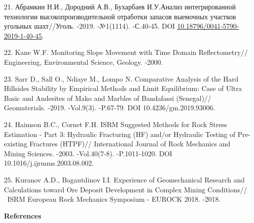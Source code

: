 \begin{refs}
21. Абрамкин Н.И., Дородний А.В., Бухарбаев И.У.Анализ интегрированной
технологии высокопроизводительной отработки запасов выемочных участков
угольных шахт//Уголь. -2019. -№1(1114). -С.40-45. DOI
\href{http://dx.doi.org/10.18796/0041-5790-2019-1-40-45}{10.18796/0041-5790-2019-1-40-45}.

22. Kane W.F. Monitoring Slope Movement with Time Domain Reflectometry//
Engineering, Environmental Science, Geology. -2000.

23. Sarr D., Sall O., Ndiaye M., Lompo N. Comparative Analysis of the
Hard Hillsides Stability by Empirical Methods and Limit Equilibrium:
Case of Ultra Basic and Andesites of Mako and Marbles of Bandafassi
(Senegal)// Geomaterials. -2019. -Vol.9(3). -P.67-79. DOI
10.4236/gm.2019.93006.

24. Haimson B.C., Cornet F.H. ISRM Suggested Methods for Rock Stress
Estimation - Part 3: Hydraulic Fracturing (HF) and/or Hydraulic Testing
of Pre-existing Fractures (HTPF)// International Journal of Rock
Mechanics and Mining Sciences. -2003. -Vol.40(7-8). -P.1011-1020. DOI
10.1016/j.ijrmms.2003.08.002.

25. Kuranov A.D., Bagautdinov I.I. Experience of Geomechanical Research
and Calculations toward Ore Deposit Development in Complex Mining
Conditions// ~ISRM European Rock Mechanics Symposium - EUROCK 2018.
-2018.
\end{refs}

\begin{center}
{\bfseries References}
\end{center}

